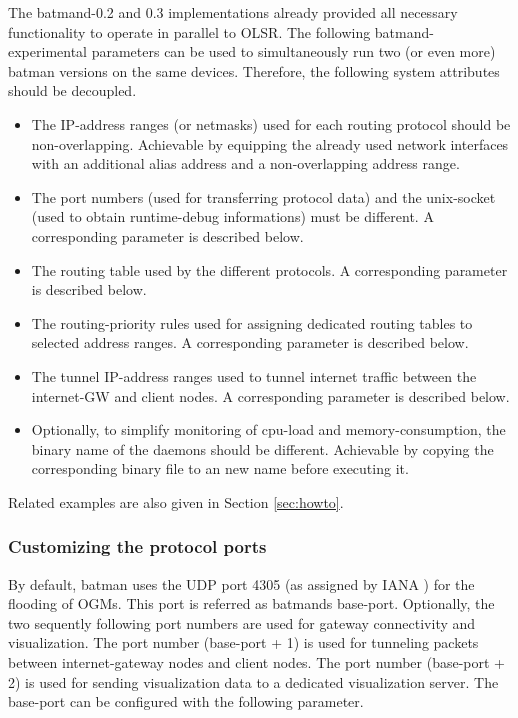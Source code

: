 \documentclass[11pt]{article}
\begin{document}
The batmand-0.2 and 0.3 implementations already provided all necessary functionality to operate in parallel to OLSR.
%
The following batmand-experimental parameters can be used to simultaneously run two (or even more) batman versions on the same devices.
Therefore, the following system attributes should be decoupled.
\begin{itemize}

 \item The IP-address ranges (or netmasks) used for each routing protocol should be non-overlapping. Achievable by equipping the already used network interfaces with an additional alias address and a non-overlapping address range.

 \item The port numbers (used for transferring protocol data) and the unix-socket (used to obtain runtime-debug informations) must be different. A corresponding parameter is described below.

 \item The routing table used by the different protocols. A corresponding parameter is described below.

 \item The routing-priority rules used for assigning dedicated routing tables to selected address ranges. A corresponding parameter is described below.

 \item The tunnel IP-address ranges used to tunnel internet traffic between the internet-GW and client nodes. A corresponding parameter is described below.

 \item Optionally, to simplify monitoring of cpu-load and memory-consumption, the binary name of the daemons should be different. Achievable by copying the corresponding binary file to an new name before executing it.

\end{itemize}
%
Related examples are also given in Section \ref{sec:howto}.

\subsubsection{Customizing the protocol ports}

By default, batman uses the UDP port 4305 (as assigned by IANA \cite{iana-ports}) for the flooding of OGMs.
This port is referred as batmands base-port.
%
Optionally, the two sequently following port numbers are used for gateway connectivity and visualization.
%
The port number (base-port + 1) is used for tunneling packets between internet-gateway nodes and client nodes.
The port number (base-port + 2) is used for sending visualization data to a dedicated visualization server.
The base-port can be configured with the following parameter.
\end{document}
